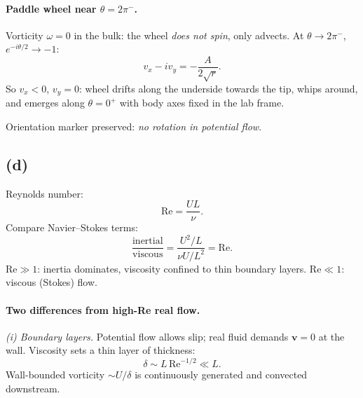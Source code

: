 \documentclass[11pt]{article}
\begin{document}
\paragraph{Paddle wheel near $\theta=2\pi^{-}$.} Vorticity $\omega = 0$ in the bulk: the wheel \emph{does not spin}, only advects. At $\theta\to 2\pi^{-}$, $e^{-i\theta/2}\to -1$:
\[ v_{x} - iv_{y} = -\frac{A}{2\sqrt{r}}. \]
So $v_{x}<0$, $v_{y}=0$: wheel drifts along the underside towards the tip, whips around, and emerges along $\theta=0^{+}$ with body axes fixed in the lab frame.

\begin{center}
\end{center}
Orientation marker preserved: \emph{no rotation in potential flow}.

\subsection*{(d)}

Reynolds number:
\[ \boxed{\;\mathrm{Re} = \frac{UL}{\nu}.\;} \]
Compare Navier--Stokes terms:
\[ \frac{\text{inertial}}{\text{viscous}} = \frac{U^{2}/L}{\nu U/L^{2}} = \mathrm{Re}. \]
$\mathrm{Re}\gg 1$: inertia dominates, viscosity confined to thin boundary layers. $\mathrm{Re}\ll 1$: viscous (Stokes) flow.

\paragraph{Two differences from high-Re real flow.}

\textit{(i) Boundary layers.} Potential flow allows slip; real fluid demands $\bm v=0$ at the wall. Viscosity sets a thin layer of thickness:
\[ \delta \sim L\,\mathrm{Re}^{-1/2} \ll L. \]
Wall-bounded vorticity $\sim U/\delta$ is continuously generated and convected downstream.
\end{document}
